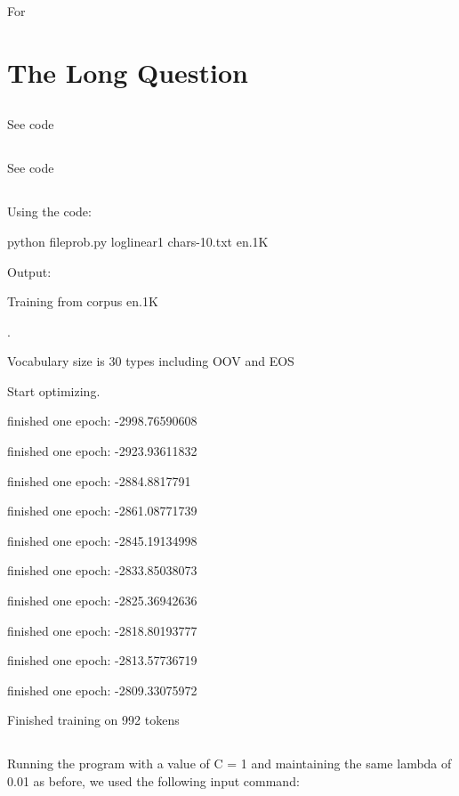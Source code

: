\documentclass[12pt, letterpaper]{article}
\begin{document}
For 

\section{The Long Question}

\subsection{}

See code

\subsection{}

See code

\subsection{}

Using the code:

python fileprob.py loglinear1 chars-10.txt en.1K

Output:

Training from corpus en.1K

.

Vocabulary size is 30 types including OOV and EOS


Start optimizing.

finished one epoch: -2998.76590608

finished one epoch: -2923.93611832

finished one epoch: -2884.8817791

finished one epoch: -2861.08771739

finished one epoch: -2845.19134998

finished one epoch: -2833.85038073

finished one epoch: -2825.36942636

finished one epoch: -2818.80193777

finished one epoch: -2813.57736719

finished one epoch: -2809.33075972

Finished training on 992 tokens


\subsection{}

Running the program with a value of C = 1 and maintaining the same lambda of 0.01 as before, we used the following input command:
\end{document}

